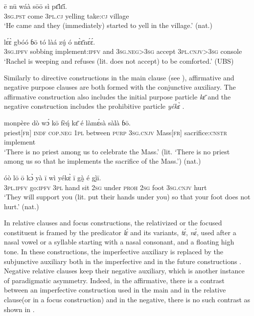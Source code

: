 \documentclass[output=paper,colorlinks,citecolor=brown]{langscibook}
\begin{document}
\ea\label{ex:mano:57}
    \gll ē nū wáà sōō sì pɛ̄lɛ̄í.  \\
         3\textsc{sg.pst} come \textsc{3pl.cj} yelling take:\textsc{cj} village  \\
    \glt ‘He came and they (immediately) started to yell in the village.’ (nat.)
\z

\ea\label{ex:mano:58}
    \gll lɛ́ɛ̀ gbóó ɓō tó làá zṵ́ ó nɛ̀ɛ̄nɛ́ɛ́. \\
         \textsc{3sg.ipfv} sobbing implement:\textsc{ipfv} and \textsc{3sg.neg>3sg} accept \textsc{3pl.cnjv>3sg} console\\
    \glt ‘Rachel is weeping and refuses (lit. does not accept) to be comforted.’ (UBS)
\z

Similarly to directive constructions in the main clause (see ), affirmative and negative purpose clauses are both formed with the conjunctive auxiliary. The affirmative construction also includes the initial purpose particle \textit{kɛ̄}  and the negative construction includes the prohibitive particle \textit{yékɛ̀} .

\ea\label{ex:mano:59}
    \gll monpère dò wɔ́ kō fèŋ́ kɛ̄ é làmɛ́sà sàlà ɓō. \\
         priest[\textsc{fr}] \textsc{indf} \textsc{cop.neg} \textsc{1pl} between \textsc{purp} \textsc{3sg.cnjv} Mass[\textsc{fr}] sacrifice:\textsc{cnstr} implement\\
    \glt ‘There is no priest among us to celebrate the Mass.’ (lit. ‘There is no priest among us so that he implements the sacrifice of the Mass.’) (nat.) 
\z

\ea\label{ex:mano:60}
    \gll óò lō ō kɔ̀ yà ī wì yékɛ̀ ī gà̰ é gḭ̀ī. \\
         \textsc{3pl.ipfv} go:\textsc{ipfv} \textsc{3pl} hand sit \textsc{2sg} under \textsc{proh} \textsc{2sg} foot \textsc{3sg.cnjv} hurt\\
    \glt ‘They will support you (lit. put their hands under you) so that your foot does not hurt.’ (nat.)
\z

In relative clauses and focus constructions, the relativized or the focused constituent is framed by the predicator \textit{lɛ́} and its variants, \textit{tɛ́}, \textit{nɛ́}, used after a nasal vowel or a syllable starting with a nasal consonant, and a floating high tone. In these constructions, the imperfective auxiliary is replaced by the subjunctive auxiliary both in the imperfective and in the future constructions . Negative relative clauses keep their negative auxiliary, which is another instance of paradigmatic asymmetry. Indeed, in the affirmative, there is a contrast between an imperfective construction used in the main and in the relative clause(or in a focus construction) and in the negative, there is no such contrast as shown in .
\end{document}
